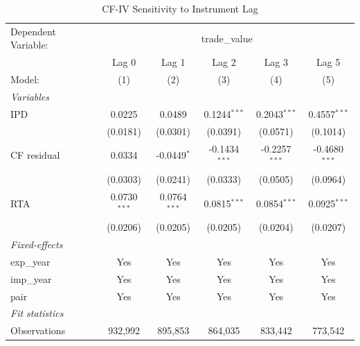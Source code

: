 
\begin{table}[htbp]
   \caption{CF-IV Sensitivity to Instrument Lag}
   \centering
   \begin{tabular}{lccccc}
      \tabularnewline \midrule \midrule
      Dependent Variable: & \multicolumn{5}{c}{trade\_value}\\
                          & Lag 0                 & Lag 1                & Lag 2                 & Lag 3                & Lag 5 \\   
      Model:              & (1)                   & (2)                  & (3)                   & (4)                  & (5)\\  
      \midrule
      \emph{Variables}\\
      IPD                 & 0.0225                & 0.0489               & 0.1244$^{***}$        & 0.2043$^{***}$       & 0.4557$^{***}$\\   
                          & (0.0181)              & (0.0301)             & (0.0391)              & (0.0571)             & (0.1014)\\   
      CF residual         & 0.0334                & -0.0449$^{*}$        & -0.1434$^{***}$       & -0.2257$^{***}$      & -0.4680$^{***}$\\   
                          & (0.0303)              & (0.0241)             & (0.0333)              & (0.0505)             & (0.0964)\\   
      RTA                 & 0.0730$^{***}$        & 0.0764$^{***}$       & 0.0815$^{***}$        & 0.0854$^{***}$       & 0.0925$^{***}$\\   
                          & (0.0206)              & (0.0205)             & (0.0205)              & (0.0204)             & (0.0207)\\   
      \midrule
      \emph{Fixed-effects}\\
      exp\_year           & Yes                   & Yes                  & Yes                   & Yes                  & Yes\\  
      imp\_year           & Yes                   & Yes                  & Yes                   & Yes                  & Yes\\  
      pair                & Yes                   & Yes                  & Yes                   & Yes                  & Yes\\  
      \midrule
      \emph{Fit statistics}\\
      Observations        & 932,992               & 895,853              & 864,035               & 833,442              & 773,542\\  

\end{tabular}
\end{table}
